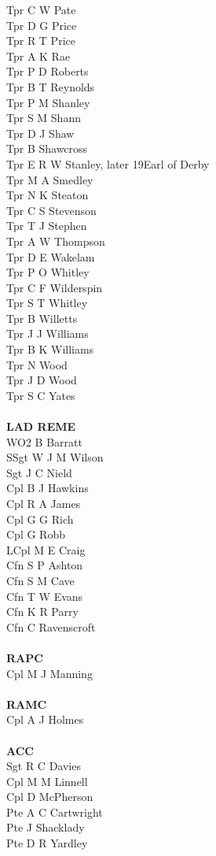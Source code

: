 \begin{multicols}{3}
  Tpr C W Pate \\
  Tpr D G Price \\
  Tpr R T Price \\
  Tpr A K Rae \\
  Tpr P D Roberts \\
  Tpr B T Reynolds \\
  Tpr P M Shanley \\
  Tpr S M Shann \\
  Tpr D J Shaw \\
  Tpr B Shawcross \\
  Tpr E R W Stanley, later 19\nth Earl of Derby \\
  Tpr M A Smedley \\
  Tpr N K Steaton \\
  Tpr C S Stevenson \\
  Tpr T J Stephen \\
  Tpr A W Thompson \\
  Tpr D E Wakelam \\
  Tpr P O Whitley \\
  Tpr C F Wilderspin \\
  Tpr S T Whitley \\
  Tpr B Willetts \\
  Tpr J J Williams \\
  Tpr B K Williams \\
  Tpr N Wood \\
  Tpr J D Wood \\
  Tpr S C Yates \\
  \\
  \textbf{LAD REME} \\
  WO2 B Barratt \\
  SSgt W J M Wilson \\
  Sgt J C Nield \\
  Cpl B J Hawkins \\
  Cpl R A James \\
  Cpl G G Rich \\
  Cpl G Robb \\
  LCpl M E Craig \\
  Cfn S P Ashton \\
  Cfn S M Cave \\
  Cfn T W Evans \\
  Cfn K R Parry \\
  Cfn C Ravenscroft \\
  \\
  \textbf{RAPC} \\
  Cpl M J Manning \\
  \\
  \textbf{RAMC} \\
  Cpl A J Holmes \\
  \\
  \textbf{ACC} \\
  Sgt R C Davies \\
  Cpl M M Linnell \\
  Cpl D McPherson \\
  Pte A C Cartwright \\
  Pte J Shacklady \\
  Pte D R Yardley \\
\end{multicols}

